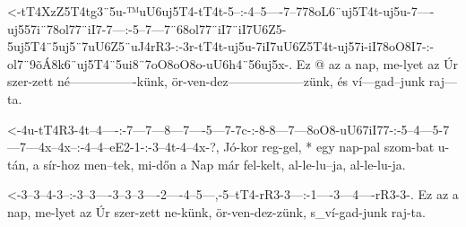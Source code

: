 

  {<-tT4XzZ5T4tg3¨5u-™uU6uj5T4-tT4t-5--:-4--5----7--778oL6¨uj5T4t-uj5u-7----uj557i¨78ol77¨iI7-7---:-5--7---7¨68ol77¨iI7¨iI7U6Z5-5uj5T4¨5uj5¨7uU6Z5¨uJ4rR3-:-3r-tT4t-uj5u-7iI7uU6Z5T4t-uj57i-iI78oO8I7-:-ol7¨9õÁ8k6¨uj5T4¨5ui8¨7oO8oO8o-uU6h4¨56uj5x-.}
  {  Ez @             az       a    nap, me-lyet az Úr            szer-zett né----------------künk, ör-ven-dez------------------zünk,                       és ví---gad--junk         raj---ta.}

  {<-4u-tT4R3-4t--4----:-7---7---8---7----5---7-7c-:-8-8---7---8oO8-uU67iI77-:-5--4---5-7---7---4x--4x--:-4--4--eE2-1-:-3--4t-4--4x-?,}
  {  Jó-kor   reg-gel, * egy nap-pal szom-bat u-tán, a sír-hoz men--tek,       mi-dőn a Nap már fel-kelt, al-le-lu--ja, al-le-lu-ja.}


  {<-3--3--4-3--:-3--3----3--3--3----2----4--5---,-5--tT4-rR3-3---:-1----3---4----rR3-3-.}
  {  Ez az a nap, me-lyet az Úr szer-zett ne-künk, ör-ven-dez-zünk, s_ví-gad-junk raj-ta.}